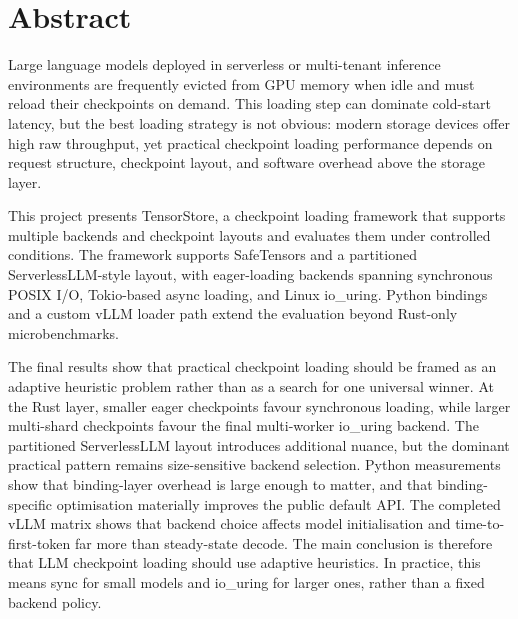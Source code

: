 \chapter*{Abstract}

Large language models deployed in serverless or multi-tenant inference environments are frequently evicted from GPU memory when idle and must reload their checkpoints on demand. This loading step can dominate cold-start latency, but the best loading strategy is not obvious: modern storage devices offer high raw throughput, yet practical checkpoint loading performance depends on request structure, checkpoint layout, and software overhead above the storage layer.

This project presents TensorStore, a checkpoint loading framework that supports multiple backends and checkpoint layouts and evaluates them under controlled conditions. The framework supports SafeTensors and a partitioned ServerlessLLM-style layout, with eager-loading backends spanning synchronous POSIX I/O, Tokio-based async loading, and Linux io\_uring. Python bindings and a custom vLLM loader path extend the evaluation beyond Rust-only microbenchmarks.

The final results show that practical checkpoint loading should be framed as an adaptive heuristic problem rather than as a search for one universal winner. At the Rust layer, smaller eager checkpoints favour synchronous loading, while larger multi-shard checkpoints favour the final multi-worker io\_uring backend. The partitioned ServerlessLLM layout introduces additional nuance, but the dominant practical pattern remains size-sensitive backend selection. Python measurements show that binding-layer overhead is large enough to matter, and that binding-specific optimisation materially improves the public default API. The completed vLLM matrix shows that backend choice affects model initialisation and time-to-first-token far more than steady-state decode. The main conclusion is therefore that LLM checkpoint loading should use adaptive heuristics. In practice, this means sync for small models and io\_uring for larger ones, rather than a fixed backend policy.
